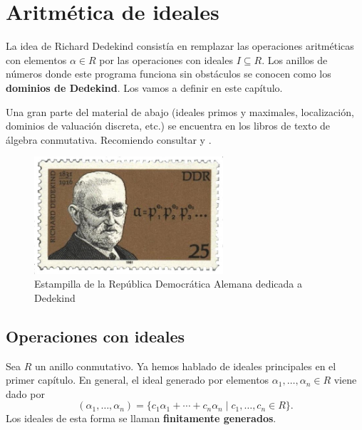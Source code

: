 \chapter{Aritmética de ideales}

La idea de Richard Dedekind consistía en remplazar las operaciones aritméticas
con elementos $\alpha \in R$ por las operaciones con ideales $I\subseteq R$.
Los anillos de números donde este programa funciona sin obstáculos se conocen
como los \textbf{dominios de Dedekind}. Los vamos a definir en este capítulo.

Una gran parte del material de abajo (ideales primos y maximales, localización,
dominios de valuación discreta, etc.) se encuentra en los libros de texto de
álgebra conmutativa. Recomiendo consultar \cite{Atiyah-Macdonald} y
\cite{Reid-UCA}.

\begin{figure}
  \begin{center}
    \includegraphics[width=7cm]{pic/Dedekind_stamp.jpg}
  \end{center}

  \caption{Estampilla de la República Democrática Alemana dedicada a Dedekind}
\end{figure}


\section{Operaciones con ideales}


Sea $R$ un anillo conmutativo. Ya hemos hablado de ideales principales en
el primer capítulo. En general, el ideal generado por elementos
$\alpha_1,\ldots,\alpha_n \in R$ viene dado por
\[ (\alpha_1,\ldots,\alpha_n) =
   \{ c_1 \alpha_1 + \cdots + c_n \alpha_n \mid c_1,\ldots,c_n \in R \}. \]
Los ideales de esta forma se llaman \textbf{finitamente generados}.

